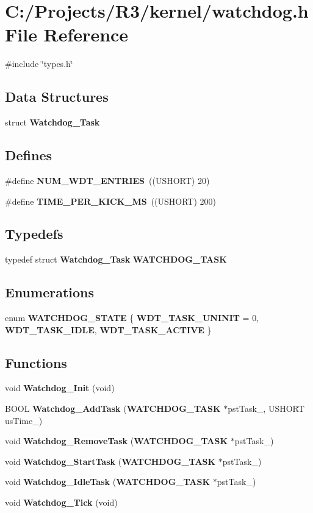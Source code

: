 \section{C:/Projects/R3/kernel/watchdog.h File Reference}
\label{watchdog_8h}
{\ttfamily \#include \char`\"{}types.h\char`\"{}}\par
\subsection*{Data Structures}
\begin{DoxyCompactItemize}
\item 
struct {\bf Watchdog\_\-Task}
\end{DoxyCompactItemize}
\subsection*{Defines}
\begin{DoxyCompactItemize}
\item 
\#define {\bf NUM\_\-WDT\_\-ENTRIES}~((USHORT) 20)
\item 
\#define {\bf TIME\_\-PER\_\-KICK\_\-MS}~((USHORT) 200)
\end{DoxyCompactItemize}
\subsection*{Typedefs}
\begin{DoxyCompactItemize}
\item 
typedef struct {\bf Watchdog\_\-Task} {\bf WATCHDOG\_\-TASK}
\end{DoxyCompactItemize}
\subsection*{Enumerations}
\begin{DoxyCompactItemize}
\item 
enum {\bf WATCHDOG\_\-STATE} \{ {\bf WDT\_\-TASK\_\-UNINIT} =  0, 
{\bf WDT\_\-TASK\_\-IDLE}, 
{\bf WDT\_\-TASK\_\-ACTIVE}
 \}
\end{DoxyCompactItemize}
\subsection*{Functions}
\begin{DoxyCompactItemize}
\item 
void {\bf Watchdog\_\-Init} (void)
\item 
BOOL {\bf Watchdog\_\-AddTask} ({\bf WATCHDOG\_\-TASK} $\ast$pstTask\_\-, USHORT usTime\_\-)
\item 
void {\bf Watchdog\_\-RemoveTask} ({\bf WATCHDOG\_\-TASK} $\ast$pstTask\_\-)
\item 
void {\bf Watchdog\_\-StartTask} ({\bf WATCHDOG\_\-TASK} $\ast$pstTask\_\-)
\item 
void {\bf Watchdog\_\-IdleTask} ({\bf WATCHDOG\_\-TASK} $\ast$pstTask\_\-)
\item 
void {\bf Watchdog\_\-Tick} (void)
\end{DoxyCompactItemize}



